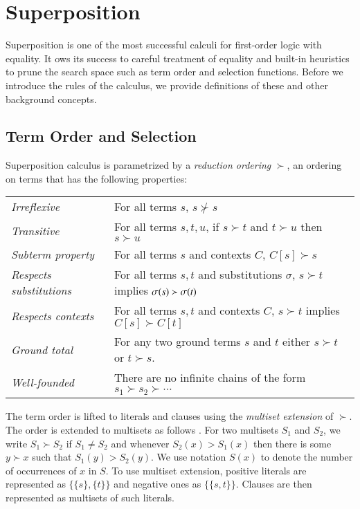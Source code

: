 \section{Superposition}

Superposition is one of the most successful calculi for first-order logic with
equality. It ows its success to careful treatment of equality and built-in
heuristics to prune the search space such as term order and selection functions.
Before we introduce the rules of the calculus, we provide definitions of these and other
background concepts.

\subsection{Term Order and Selection}

Superposition calculus is parametrized by a {\em reduction ordering} $\succ$, an
ordering on terms that has the following properties:

\noindent\begin{tabular}{p{}p{}}
    \textit{Irreflexive} & For all terms $s$, $s \not\succ s$ \\
    \textit{Transitive} & For all terms $s, t, u$,  if $s\succ t$ and $t \succ u$ then $s \succ u$ \\ 
    \textit{Subterm property} & For all terms $s$ and contexts $C$, $C[s] \succ s$ \\
    \textit{Respects substitutions} & For all terms $s, t$ and substitutions $\sigma$, $s \succ t$ implies $\sigma(s) \succ \sigma(t)$ \\
    \textit{Respects contexts} & For all terms $s,t$ and contexts $C$, $s \succ t$ implies $C[s] \succ C[t]$ \\
    \textit{Ground total} & For any two
    ground terms $s$ and $t$ either $s \succ t$ or $t \succ s$. \\
    \textit{Well-founded} & There are no infinite chains of the form $s_1 \succ s_2 \succ \cdots$ 
\end{tabular}

The term order is lifted to literals and clauses using the {\em multiset extension} of
$\succ$. The order is extended to multisets as follows
\cite[Sect.~2.5]{bg-01-resolution}. For two multisets $S_1$ and $S_2$, we write $S_1 \succ S_2$ if $S_1 \not= S_2$
and whenever $S_2(x) > S_1(x)$ then there is some $y \succ x$ such that $S_1(y)
> S_2(y)$. We use notation $S(x)$ to denote the number of occurrences of $x$ in
$S$. To use multiset extension, positive literals are represented as $ \{ \{s\},
\{t\} \}$ and negative ones as $\{ \{ s, t \} \}$. Clauses are then represented as 
multisets of such literals. 

